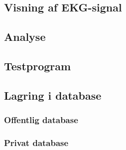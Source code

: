 \subsection{Visning af EKG-signal}

\subsection{Analyse}

\subsection{Testprogram}

\subsection{Lagring i database} 

\subsubsection{Offentlig database}

\subsubsection{Privat database}







